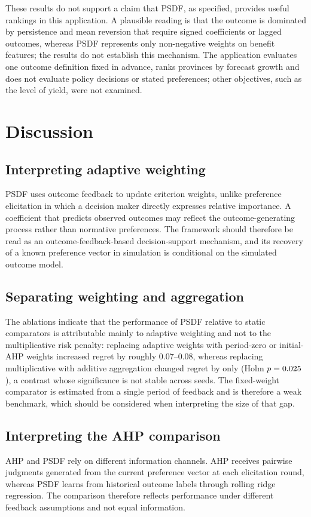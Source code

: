 \documentclass[12pt,a4paper]{article}
\begin{document}
These results do not support a claim that PSDF, as specified, provides useful rankings in this application. A plausible reading is that the outcome is dominated by persistence and mean reversion that require signed coefficients or lagged outcomes, whereas PSDF represents only non-negative weights on benefit features; the results do not establish this mechanism. The application evaluates one outcome definition fixed in advance, ranks provinces by forecast growth and does not evaluate policy decisions or stated preferences; other objectives, such as the level of yield, were not examined.

\section{Discussion}
\subsection{Interpreting adaptive weighting}
PSDF uses outcome feedback to update criterion weights, unlike preference elicitation in which a decision maker directly expresses relative importance. A coefficient that predicts observed outcomes may reflect the outcome-generating process rather than normative preferences. The framework should therefore be read as an outcome-feedback-based decision-support mechanism, and its recovery of a known preference vector in simulation is conditional on the simulated outcome model.

\subsection{Separating weighting and aggregation}
The ablations indicate that the performance of PSDF relative to static comparators is attributable mainly to adaptive weighting and not to the multiplicative risk penalty: replacing adaptive weights with period-zero or initial-AHP weights increased regret by roughly 0.07--0.08, whereas replacing multiplicative with additive aggregation changed regret by only \AddDiff{} (Holm $p=0.025$), a contrast whose significance is not stable across seeds. The fixed-weight comparator is estimated from a single period of feedback and is therefore a weak benchmark, which should be considered when interpreting the size of that gap.

\subsection{Interpreting the AHP comparison}
AHP and PSDF rely on different information channels. AHP receives pairwise judgments generated from the current preference vector at each elicitation round, whereas PSDF learns from historical outcome labels through rolling ridge regression. The comparison therefore reflects performance under different feedback assumptions and not equal information.
\end{document}
